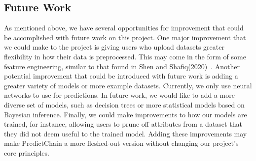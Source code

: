 \documentclass{ledger}
\begin{document}
\subsection{Future Work}

As mentioned above, we have several opportunities for improvement that could be accomplished with future work
on this project.  One major improvement that we could make to the project is giving users who upload datasets greater
flexibility in how their data is preprocessed.  This may come in the form of some feature engineering, similar to
that found in Shen and Shafiq(2020)~\cite{deepPrediction}.  Another potential improvement that could be introduced with
future work is adding a greater variety of models or more example datasets.  Currently, we only use neural networks to
use for predictions.  In future work, we would like to add a more diverse set of models, such as decision trees or
more statistical models based on Bayesian inference.  Finally, we could make improvements to how our models are
trained, for instance, allowing users to prune off attributes from a dataset that they did not deem useful to the
trained model.  Adding these improvements may make PredictChain a more fleshed-out version without changing our project's
core principles.

\ledgernotes





\pagebreak






\end{document}
